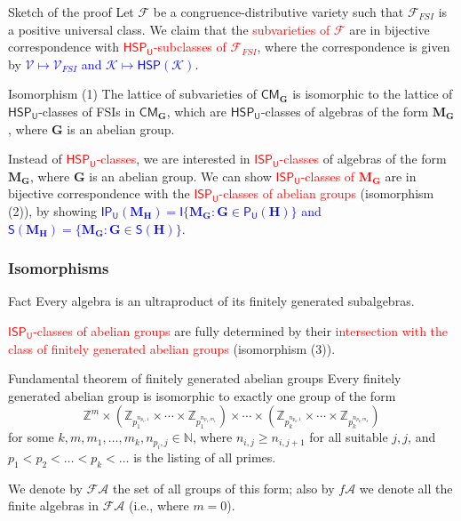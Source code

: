 \documentclass[professionalfont, 10pt]{beamer} %
\theoremstyle{plain}
\theoremstyle{definition}
\newcommand{\m}[1]{{\mathbf {#1} }}
\begin{document}
\begin{frame}{Sketch of the proof}
    Let $\mathcal{F}$ be a congruence-distributive variety such that $\mathcal{F}_{FSI}$ is a positive universal class.
    We claim that the \textcolor{red}{subvarieties of $\mathcal{F}$} are in bijective correspondence with \textcolor{red}{$\mathsf{HSP_U}$-subclasses of $\mathcal{F}_{FSI}$}, where the correspondence is given by 
    \textcolor{blue}{$\mathcal{V} \mapsto \mathcal{V}_{FSI}$ and $\mathcal{K} \mapsto \mathsf{HSP}(\mathcal{K})$}.\pause
    \begin{block}{Isomorphism (1)}
        The lattice of subvarieties of $\mathsf{CM}_{\mathbf{G}}$ is isomorphic to the lattice of  $\mathsf{HSP_U}$-classes of FSIs in $\mathsf{CM}_{\mathbf{G}}$, which are $\mathsf{HSP_U}$-classes of algebras of the form $\m{M}_{\m{G}}$, where $\m{G}$ is an abelian group.
    \end{block}
    \pause
    Instead of \textcolor{red}{$\mathsf{HSP_U}$-classes}, we are interested in \textcolor{red}{$\mathsf{ISP_U}$-classes} of algebras of the form $\m{M}_{\m{G}}$, where $\m{G}$ is an abelian group.\pause
    We can show \textcolor{red}{$\mathsf{ISP_U}$-classes of $\m M_{\m G}$} are in bijective correspondence with the \textcolor{red}{$\mathsf{ISP_U}$-classes of abelian groups} (isomorphism (2)), by showing \textcolor{blue}{$\mathsf{IP_U}(\m{M}_{\m{H}})=\mathsf{I}\{\m{M}_{\m{G}}: \m{G} \in \mathsf{P_U}(\m{H})\}$ and $\mathsf{S}(\m{M}_{\m{H}})=\{\m{M}_{\m{G}}:  \m{G} \in \mathsf{S}(\m{H})\}$.}
\end{frame}

\begin{frame}
\frametitle{Isomorphisms}
    \begin{block}{Fact}
        Every algebra is an ultraproduct of its finitely generated subalgebras.
    \end{block}
    \textcolor{red}{$\mathsf{ISP_U}$-classes of abelian groups} are fully determined by their \textcolor{red}{intersection with the class of finitely generated abelian groups} (isomorphism (3)).\pause

    \begin{block}{Fundamental theorem of finitely generated abelian groups}
        Every finitely generated abelian group is isomorphic to exactly one group of the form
        \[
            \mathbb{Z}^m \times (\mathbb{Z}_{p_1^{n_{p_1, 1}}} \times \cdots \times \mathbb{Z}_{p_1^{n_{p_1,m_1}}}) \times \cdots \times (\mathbb{Z}_{p_k^{n_{p_k, 1}}} \times \cdots \times \mathbb{Z}_{p_k^{n_{p_k,m_k}}})  
        \]
        for some $k, m, m_1, \dots, m_k,n_{p_i,j} \in \mathbb{N}$, where $n_{i,j} \geq n_{i,j+1}$ for all suitable $j,j$, and $p_1 < p_2< \dots < p_k < \ldots $ is the listing of all primes.
    \end{block}
    We denote by $\mathcal{FA}$ the set of all groups of this form; also by $f\mathcal{A}$ we denote all the finite algebras in $\mathcal{FA}$ (i.e., where $m=0$).
\end{frame}
\end{document}
